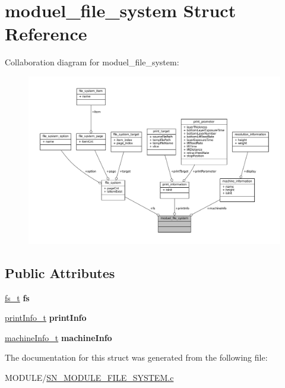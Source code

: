 \hypertarget{structmoduel__file__system}{}\section{moduel\+\_\+file\+\_\+system Struct Reference}
\label{structmoduel__file__system}


Collaboration diagram for moduel\+\_\+file\+\_\+system\+:\nopagebreak
\begin{figure}[H]
\begin{center}
\leavevmode
\includegraphics[width=350pt]{structmoduel__file__system__coll__graph}
\end{center}
\end{figure}
\subsection*{Public Attributes}
\begin{DoxyCompactItemize}
\item 
\mbox{\label{structmoduel__file__system_aafdf8289cdfbf1c2f9b8d251a519e6bc}} 
\hyperlink{structfile__system}{fs\+\_\+t} {\bfseries fs}
\item 
\mbox{\label{structmoduel__file__system_a764850bca89b06bf2e94119e2140c146}} 
\hyperlink{structprint__information}{print\+Info\+\_\+t} {\bfseries print\+Info}
\item 
\mbox{\label{structmoduel__file__system_a7f5988706364b1bb4b2110921b69c346}} 
\hyperlink{structmachine__information}{machine\+Info\+\_\+t} {\bfseries machine\+Info}
\end{DoxyCompactItemize}


The documentation for this struct was generated from the following file\+:\begin{DoxyCompactItemize}
\item 
M\+O\+D\+U\+L\+E/\hyperlink{SN__MODULE__FILE__SYSTEM_8c}{S\+N\+\_\+\+M\+O\+D\+U\+L\+E\+\_\+\+F\+I\+L\+E\+\_\+\+S\+Y\+S\+T\+E\+M.\+c}\end{DoxyCompactItemize}
